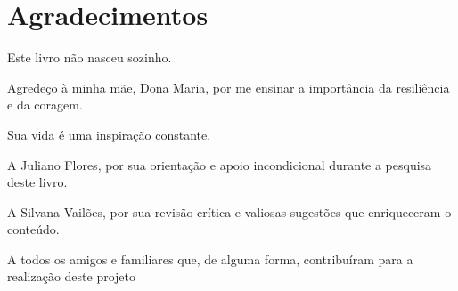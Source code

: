 \chapter*{Agradecimentos}

Este livro não nasceu sozinho.

\vspace{8pt}

Agredeço à minha mãe, Dona Maria, por me ensinar a importância da resiliência e da coragem. 

Sua vida é uma inspiração constante.

A Juliano Flores, por sua orientação e apoio incondicional durante a pesquisa deste livro.

A Silvana Vailões, por sua revisão crítica e valiosas sugestões que enriqueceram o conteúdo.

A todos os amigos e familiares que, de alguma forma, contribuíram para a realização deste projeto

\cleardoublepage
